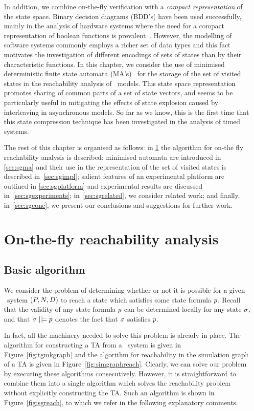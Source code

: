 In addition, we combine on-the-fly verification with a \emph{compact
representation} of the state space. Binary decision diagrams (BDD's)
have been used successfully, mainly in the analysis of hardware
systems where the need for a compact representation of boolean
functions is prevalent~\cite{bry:86}. However, the modelling of
software systems commonly employs a richer set of data types and this
fact motivates the investigation of different encodings of sets of
states than by their characteristic functions. In this chapter, we
consider the use of minimised deterministic finite state automata
(MA's)~\cite{hp:99} for the storage of the set of visited states in
the reachability analysis of \bcandle\ models. This state space
representation promotes sharing of common parts of a set of state
vectors, and seems to be particularly useful in mitigating the effects
of state explosion caused by interleaving in asynchronous models.  So
far as we know, this is the first time that this state compression
technique has been investigated in the analysis of timed systems.

The rest of this chapter is organised as follows: in
\Sec\ref{sec:sgonthefly} the algorithm for on-the fly reachability
analysis is described; minimised automata are introduced in
\Sec\ref{sec:sgma} and their use in the
representation of the set of visited states is described
in~\Sec\ref{sec:sgimpl}; salient features of an experimental platform
are outlined in \Sec\ref{sec:sgplatform} and experimental results are
discussed in~\Sec\ref{sec:sgexperiments}; in~\Sec\ref{sec:sgrelated},
we consider related work; and finally, in~\Sec\ref{sec:sgconc}, we
present our conclusions and suggestions for further work.

\section{On-the-fly reachability analysis}\label{sec:sgonthefly}
\subsection{Basic algorithm}
We consider the problem of determining whether or not it is possible
for a given \bcandle\ system $({P},{N},{D})$ to reach a state which
satisfies some state formula $p$. Recall that the
validity of any state formula $p$ can be determined locally for any 
state $\sigma$, and that $\sigma \mathrel{|\!\models} p$ denotes the fact
that $\sigma$ satisfies $p$. 

In fact, all the machinery needed to solve this problem is already in
place.  The algorithm for constructing a TA from a \bcandle\ system is
given in Figure~\ref{fig:tgmkgraph} and the algorithm for reachability
in the simulation graph of a TA is given in
Figure~\ref{fig:simgraphreach}. Clearly, we can solve our problem by
executing these algorithms consecutively. However, it is straightforward to
combine them into a single algorithm which solves the reachability problem
without explicitly constructing the TA. Such an algorithm is shown in 
Figure~\ref{fig:sgreach}, to which we refer in the following explanatory
comments.

